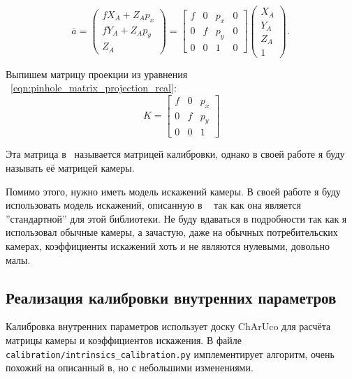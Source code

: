 \documentclass[14pt, a4paper]{extarticle}
\begin{document}
\begin{equation}
    \overline{a} = \begin{pmatrix}
        fX_A + Z_A p_x\\
        fY_A + Z_A p_y\\
        Z_A
    \end{pmatrix} = \begin{bmatrix}
        f & 0 & p_x & 0 \\
        0 & f & p_y & 0 \\
        0 & 0 & 1 & 0
    \end{bmatrix} \begin{pmatrix}
        X_A\\
        Y_A\\
        Z_A\\
        1
    \end{pmatrix}.
~\label{eqn:pinhole_matrix_projection_real}
\end{equation}

Выпишем матрицу проекции из уравнения ~\eqref{eqn:pinhole_matrix_projection_real}:
\begin{equation}
    K = \begin{bmatrix}
        f & 0 & p_x\\
        0 & f & p_y\\
        0 & 0 & 1
    \end{bmatrix}
\end{equation}

Эта матрица в~\cite{multiview_cv} называется матрицей калибровки, однако в своей
работе я буду называть её матрицей камеры. 

Помимо этого, нужно иметь модель искажений камеры.
В своей работе я буду использовать модель искажений, описанную в
~\cite{opencv_calibration_tutorial} так как она является ''стандартной'' для этой
библиотеки.  Не буду вдаваться в подробности так как я использовал обычные
камеры, а зачастую, даже на обычных потребительских камерах, коэффициенты
искажений хоть и не являются нулевыми, довольно малы.

\subsection{Реализация калибровки внутренних параметров}
\label{sec:camera_intrinsics_calibration}
Калибровка внутренних параметров использует доску ChArUco для расчёта матрицы
камеры и коэффициентов искажения. В файле\\
\texttt{calibration/intrinsics\_calibration.py} имплементирует алгоритм, очень
похожий на описанный в\cite{opencv_calibration_tutorial}, но с небольшими
изменениями.
\end{document}
